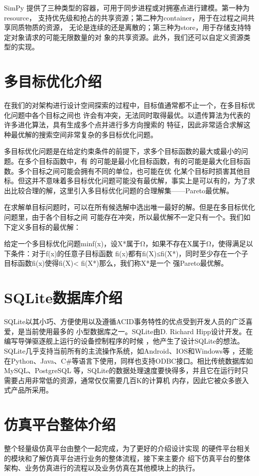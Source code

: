 SimPy 提供了三种类型的容器，可用于同步进程或对拥塞点进行建模。第一种为resource，
支持优先级和抢占的共享资源；第二种为container，用于在过程之间共享同质物质的资源，
无论是连续的还是离散的；第三种为store，用于存储支持特定对象请求的可能无限数量的对
象的共享资源。此外，我们还可以自定义资源类型的实现。

  \section{多目标优化介绍}
  在我们的对架构进行设计空间探索的过程中，目标值通常都不止一个，在多目标优化问题中各个目标之间也
  许会有冲突，无法同时取得最优。以遗传算法为代表的许多进化算法\cite{20}，具有生成多个点并进行多方向搜索的
  特征，因此非常适合求解这种最优解的搜索空间非常复杂的多目标优化问题\cite{21}。


  多目标优化问题是在给定约束条件的前提下，求多个目标函数的最大或最小的问题\cite{22}。在多个目标函数中，有
  的可能是最小化目标函数，有的可能是最大化目标函数。多个目标之间可能会拥有不同的单位，也可能在优
  化某个目标时损害其他目标。但这并不意味着多目标优化问题可能没有最优解，事实上是可以有的，为了求
  出比较合理的解，这里引入多目标优化问题的合理解集——Pareto最优解\cite{23}。


  在求解单目标问题时，可以在所有候选解中选出唯一最好的解。但是在多目标优化问题里，由于各个目标之间
  可能存在冲突，所以最优解不一定只有一个。我们如下定义多目标的最优解：

  给定一个多目标优化问题minf(x)，设X*属于Ω，如果不存在X属于Ω，使得满足以下条件：对于f(x)的任意子目标函数
  fi(x)都有fi(X)≤fi(X*)，同时至少存在一个子目标函数fi(x)使得fi(X)< fi(X*)那么，我们称X*是一个
  强Pareto最优解\cite{24}。

  \section{SQLite数据库介绍}
  SQLite以其小巧、方便使用以及遵循ACID事务特性的优点受到开发人员的广泛喜爱，是当前使用最多的
  小型数据库之一\cite{25}。SQLite由D. Richard Hipp设计开发。在编写导弹驱逐舰上运行的设备控制程序的时候
  ，他产生了设计SQLite的想法\cite{26}。SQLite几乎支持当前所有的主流操作系统，如Android、IOS和Windows等
  ，还能在Python、Java、C\#等语言下使用，同样也支持ODBC接口。相比传统数据库如MySQL、PostgreSQL 
  等，SQLite的数据处理速度要快得多\cite{27}，并且它在运行时只需要占用非常低的资源，通常仅仅需要几百K的计算机
  内存，因此它被众多嵌入式产品所采用。

  \section{仿真平台整体介绍}
  整个轻量级仿真平台由整个一起完成，为了更好的介绍设计实现
  的硬件平台相关的模块和了解仿真平台进行业务的整体流程，接下来主要介
  绍下仿真平台的整体架构、业务仿真进行的流程以及业务仿真在其他模块上的执行。

